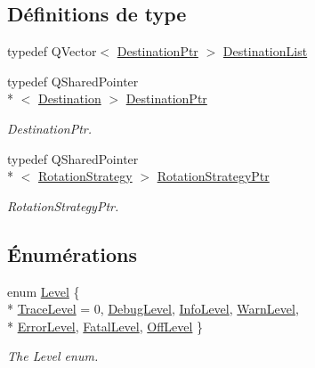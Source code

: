 \subsection*{Définitions de type}
\begin{DoxyCompactItemize}
\item 
typedef Q\-Vector$<$ \hyperlink{namespaceQsLogging_a8fe41cf859d617f1c23515f804d1e8ec}{Destination\-Ptr} $>$ \hyperlink{namespaceQsLogging_a566a41f076f9a05c94cb6980ec554e2c}{Destination\-List}
\item 
typedef Q\-Shared\-Pointer\\*
$<$ \hyperlink{classQsLogging_1_1Destination}{Destination} $>$ \hyperlink{namespaceQsLogging_a8fe41cf859d617f1c23515f804d1e8ec}{Destination\-Ptr}
\begin{DoxyCompactList}\small\item\em Destination\-Ptr. \end{DoxyCompactList}\item 
typedef Q\-Shared\-Pointer\\*
$<$ \hyperlink{classQsLogging_1_1RotationStrategy}{Rotation\-Strategy} $>$ \hyperlink{namespaceQsLogging_a41dc81d39cd3d36d9e15746bd9174be0}{Rotation\-Strategy\-Ptr}
\begin{DoxyCompactList}\small\item\em Rotation\-Strategy\-Ptr. \end{DoxyCompactList}\end{DoxyCompactItemize}
\subsection*{Énumérations}
\begin{DoxyCompactItemize}
\item 
enum \hyperlink{namespaceQsLogging_a38c7dd87e4de6f8eb460763ad0baa033}{Level} \{ \\*
\hyperlink{namespaceQsLogging_a38c7dd87e4de6f8eb460763ad0baa033a187ba10e2b3b400c6ee33afe6fc10915}{Trace\-Level} = 0, 
\hyperlink{namespaceQsLogging_a38c7dd87e4de6f8eb460763ad0baa033a2a6c1ca8703fa87e56dae43e9adbecda}{Debug\-Level}, 
\hyperlink{namespaceQsLogging_a38c7dd87e4de6f8eb460763ad0baa033a6447c84a2844e8e1d0cdb95b55ecac72}{Info\-Level}, 
\hyperlink{namespaceQsLogging_a38c7dd87e4de6f8eb460763ad0baa033ac744dbb976c301fa466a390b808e2eef}{Warn\-Level}, 
\\*
\hyperlink{namespaceQsLogging_a38c7dd87e4de6f8eb460763ad0baa033a3d6b56d79245ec74186a538f2e6b3cf2}{Error\-Level}, 
\hyperlink{namespaceQsLogging_a38c7dd87e4de6f8eb460763ad0baa033ab961256fd76d6571a41516e1794f39de}{Fatal\-Level}, 
\hyperlink{namespaceQsLogging_a38c7dd87e4de6f8eb460763ad0baa033a64b8289ed8a99f811404140cbcb2549c}{Off\-Level}
 \}
\begin{DoxyCompactList}\small\item\em The Level enum. \end{DoxyCompactList}\end{DoxyCompactItemize}
